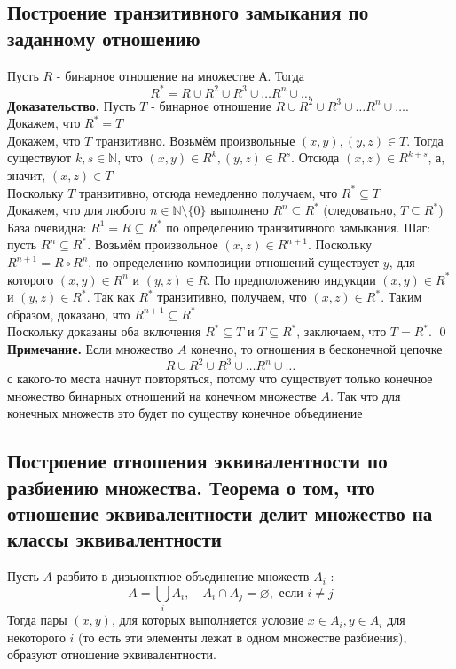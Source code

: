 \documentclass[a4paper]{article}
\begin{document}
\subsection{Построение транзитивного замыкания по заданному отношению}
Пусть $R$ - бинарное отношение на множестве А. Тогда
$$
R^{*}=R \cup R^{2} \cup R^{3} \cup \ldots R^{n} \cup \ldots
$$
\textbf{Доказательство.} Пусть $T$ - бинарное отношение $R \cup R^{2} \cup R^{3} \cup \ldots R^{n} \cup \ldots$. Докажем, что $R^{*}=T$\\[2mm]
Докажем, что $T$ транзитивно. Возьмём произвольные $(x, y),(y, z) \in T$. Тогда существуют $k, s \in \mathbb{N}$, что $(x, y) \in R^{k},(y, z) \in R^{s}$. Отсюда $(x, z) \in R^{k+s}$, а, значит, $(x, z) \in T$\\[2mm]
Поскольку $T$ транзитивно, отсюда немедленно получаем, что $R^{*} \subseteq T$\\[2mm]
Докажем, что для любого $n \in \mathbb{N} \setminus\{0\}$ выполнено $R^{n} \subseteq R^{*}$ (следоватьно, $T \subseteq R^{*}$)\\
База очевидна: $R^{1}=R \subseteq R^{*}$ по определению транзитивного замыкания. Шаг: пусть $R^{n} \subseteq R^{*}$. Возьмём произвольное $(x, z) \in R^{n+1}$. Поскольку $R^{n+1}=R \circ R^{n}$, по определению композиции отношений существует $y$, для которого $(x, y) \in R^{n}$ и $(y, z) \in R$. По предположению индукции $(x, y) \in R^{*}$ и $(y, z) \in R^{*}$. Так как $R^{*}$ транзитивно, получаем, что $(x, z) \in R^{*}$. Таким образом, доказано, что $R^{n+1} \subseteq R^{*}$\\[2mm]
 Поскольку доказаны оба включения $R^{*} \subseteq T$ и $T \subseteq R^{*}$, заключаем, что $T=R^{*}$. \qed\\[2mm]
\textbf{Примечание.} Если множество $A$ конечно, то отношения в бесконечной цепочке $$R \cup R^{2} \cup R^{3} \cup \ldots R^{n} \cup \ldots$$ с какого-то места начнут повторяться, потому что существует только конечное множество бинарных отношений на конечном множестве $A$. Так что для конечных множеств это будет по существу конечное объединение

\subsection{Построение отношения эквивалентности по разбиению множества. Теорема о том, что отношение эквивалентности делит множество на классы эквивалентности}
\ex Пусть $A$ разбито в дизъюнктное объединение множеств $A_i$ :
\begin{equation*}
A=\bigcup_i A_i, \quad A_i \cap A_j=\varnothing, \text { если } i \neq j
\end{equation*}
Тогда пары $(x, y)$, для которых выполняется условие $x \in A_i, y \in A_i$ для некоторого $i$ (то есть эти элементы лежат в одном множестве разбиения), образуют отношение эквивалентности.
\end{document}
